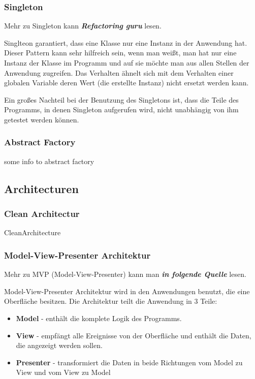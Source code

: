 \documentclass{article}
\begin{document}
        \subsubsection{Singleton}
        \label{kap:gof:singleton}
            Mehr zu Singleton kann \textit{\textbf{Refactoring guru}} lesen.

            Singlteon garantiert, dass eine Klasse nur eine Instanz in der Anwendung hat.
            Dieser Pattern kann sehr hilfreich sein, wenn man weißt, man hat nur eine Instanz der Klasse im Programm 
            und auf sie möchte man aus allen Stellen der Anwendung zugreifen.
            Das Verhalten ähnelt sich mit dem Verhalten einer 
            globalen Variable deren Wert (die erstellte Instanz) nicht ersetzt werden kann.

            Ein großes Nachteil bei der Benutzung des Singletons ist, 
            dass die Teile des Programms, in denen Singleton aufgerufen wird, nicht unabhängig von ihm getestet werden können.
        \subsubsection{Abstract Factory}
            some info to abstract factory

    \subsection{Architecturen}
        \subsubsection{Clean Architectur}
            {CleanArchitecture}
        \newpage
        \subsubsection{Model-View-Presenter Architektur}
            Mehr zu MVP (Model-View-Presenter) kann man \textit{\textbf{in folgende Quelle}} lesen.

            Model-View-Presenter Architektur wird in den Anwendungen benutzt, die eine Oberfläche besitzen.
            Die Architektur teilt die Anwendung in 3 Teile:
            \begin{itemize}
                \item \textbf{Model} - enthält die komplete Logik des Programms.
                \item \textbf{View} - empfängt alle Ereignisse von der Oberfläche und enthält die Daten, die angezeigt werden sollen.
                \item \textbf{Presenter} - transformiert die Daten in beide Richtungen vom Model zu View 
                und vom View zu Model
            \end{itemize}
\end{document}
